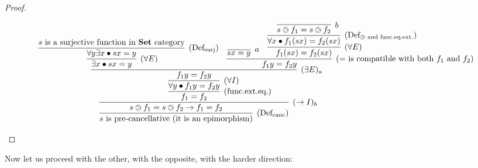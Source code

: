 \documentclass{article}
\newcommand{\setCat}{\mathbf{Set}}
\theoremstyle{definition}
\begin{document}
	\begin{proof}
		\begin{adjustwidth}{-100pt}{0pt}
			\[
				\infer[(\to I)_b]{
					\infer[(\text{Def}_{\text{canc}})]{
						\text{$s$ is pre-cancellative (it is an epimorphism)}
					}{
						s\ogreaterthan f_1 = s\ogreaterthan f_2 \to f_1 = f_2
					}
				}{
					\infer[(\text{func.ext.eq.})]{
						f_1 = f_2
					}{
						\infer[(\forall I)]{
							\forall y \bullet f_1 y = f_2 y
						}{
							\infer[(\exists E)_a]{
								f_1 y = f_2 y
							}{
								\infer[(\forall E)]{
									\exists x \bullet sx = y
								}{
									\infer[(\text{Def}_{\text{surj}})]{
										\forall y \exists x \bullet sx = y
									}{
										\text{$s$ is a surjective function in $\setCat$ category}
									}
								}
								&
								\infer[(\text{$=$ is compatible with both $f_1$ and $f_2$})]{
									f_1 y = f_2 y
								}{
									\infer[a]{sx = y}{}
									&
									\infer[(\forall E)]{
										f_1(sx) = f_2(sx)
									}{
										\infer[(\text{Def}_{\text{$\ogreaterthan$ and func.eq.ext.}})]{
											\forall x \bullet f_1(sx) = f_2(sx)
										}{
											\infer[b]{
												s\ogreaterthan f_1 = s\ogreaterthan f_2
											}{}
										}
									}
								}
							}
						}
					}
				}
			\]
		\end{adjustwidth}
	\end{proof}

	Now let us proceed with the other, with the opposite, with the harder direction:
\end{document}

